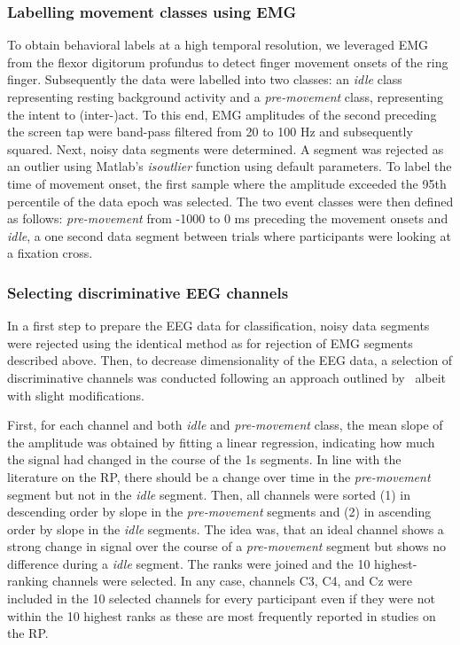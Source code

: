 \subsubsection{Labelling movement classes using EMG}
To obtain behavioral labels at a high temporal resolution, we leveraged EMG from the flexor digitorum profundus to detect finger movement onsets of the ring finger. Subsequently the data were labelled into two classes: an \textit{idle} class representing resting background activity and a \textit{pre-movement} class, representing the intent to (inter-)act. To this end, EMG amplitudes of the second preceding the screen tap were band-pass filtered from 20 to 100 Hz and subsequently squared. Next, noisy data segments were determined. A segment was rejected as an outlier using Matlab's \textit{isoutlier} function using default parameters. To label the time of movement onset, the first sample where the amplitude exceeded the 95th percentile of the data epoch was selected. The two event classes were then defined as follows: \textit{pre-movement} from -1000 to 0 ms preceding the movement onsets and \textit{idle}, a one second data segment between trials where participants were looking at a fixation cross.


\subsubsection{Selecting discriminative EEG channels}
In a first step to prepare the EEG data for classification, noisy data segments were rejected using the identical method as for rejection of EMG segments described above. Then, to decrease dimensionality of the EEG data, a selection of discriminative channels was conducted following an approach outlined by~\citep{Schultze-Kraft2021-cu} albeit with slight modifications.

First, for each channel and both \textit{idle} and \textit{pre-movement} class, the mean slope of the amplitude was obtained by fitting a linear regression, indicating how much the signal had changed in the course of the 1s segments. In line with the literature on the RP, there should be a change over time in the \textit{pre-movement} segment but not in the \textit{idle} segment. Then, all channels were sorted (1) in descending order by slope in the \textit{pre-movement} segments and (2) in ascending order by slope in the \textit{idle} segments. The idea was, that an ideal channel shows a strong change in signal over the course of a \textit{pre-movement} segment but shows no difference during a \textit{idle} segment. The ranks were joined and the 10 highest-ranking channels were selected. In any case, channels C3, C4, and Cz were included in the 10 selected channels for every participant even if they were not within the 10 highest ranks as these are most frequently reported in studies on the RP.

